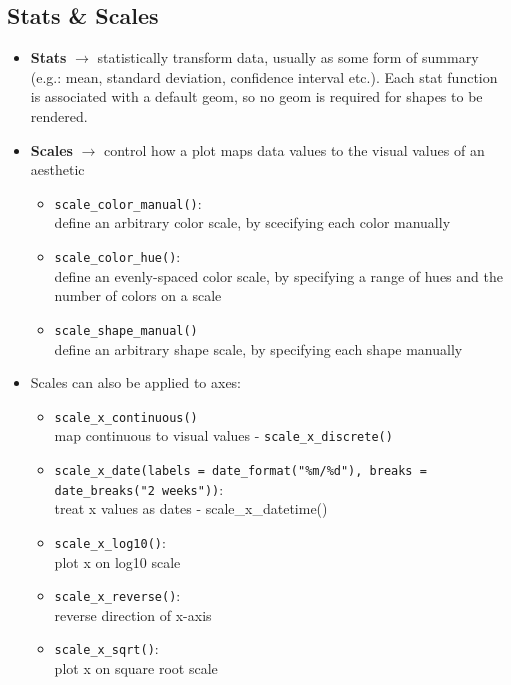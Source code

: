 \documentclass[a4paper]{article}
\begin{document}
		\newpage
		
		\subsection{Stats \& Scales}
		
		\begin{itemize}
			\item \textbf{Stats} $\rightarrow$ statistically transform data, usually as some form of summary (e.g.: mean, standard deviation, confidence interval etc.).
				Each stat function is associated with a default geom, so no geom is required for shapes to be rendered.
			\item \textbf{Scales} $\rightarrow$ control how a plot maps data values to the visual values of an aesthetic
				\begin{itemize}
					\item \texttt{scale\_color\_manual()}: \\
						define an arbitrary color scale, by scecifying each color manually
					\item \texttt{scale\_color\_hue()}: \\
						define an evenly-spaced color scale, by specifying a range of hues and the number of colors on a scale
					\item \texttt{scale\_shape\_manual()} \\
						define an arbitrary shape scale, by specifying each shape manually
				\end{itemize}
			\item Scales can also be applied to axes:
				\begin{itemize}
					\item \texttt{scale\_x\_continuous()} \\
						map continuous to visual values - \texttt{scale\_x\_discrete()}
					\item \texttt{scale\_x\_date(labels = date\_format("\%m/\%d"), breaks = date\_breaks("2 weeks"))}: \\
						treat x values as dates - scale\_x\_datetime()
					\item \texttt{scale\_x\_log10()}: \\
						plot x on log10 scale
					\item \texttt{scale\_x\_reverse()}: \\
						reverse direction of x-axis
					\item \texttt{scale\_x\_sqrt()}: \\
						plot x on square root scale
				\end{itemize}
		\end{itemize}
	
\end{document}
